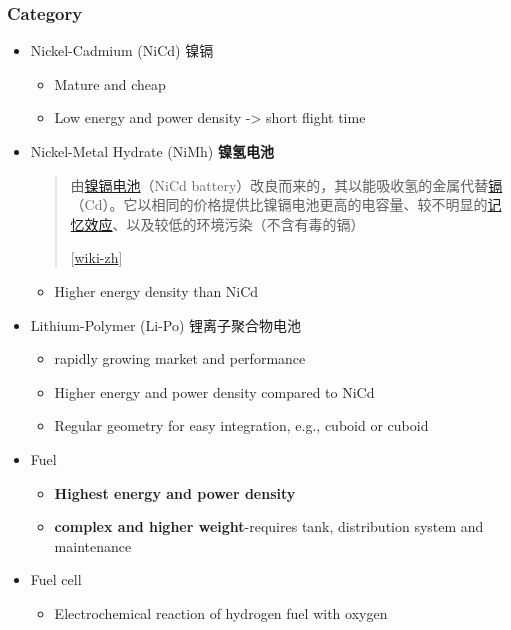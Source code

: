 \documentclass[]{article}
\begin{document}
\subsubsection{Category}\label{header-n1918}

\begin{itemize}
\item
  Nickel-Cadmium (NiCd) \textbar{} 镍镉

  \begin{itemize}
  \item
    Mature and cheap
  \item
    Low energy and power density -\textgreater{} short flight time
  \end{itemize}
\item
  Nickel-Metal Hydrate (NiMh) \textbar{} \textbf{镍氢电池}

  \begin{quote}
  由\href{https://zh.wikipedia.org/wiki/鎳鎘電池}{镍镉电池}（NiCd
  battery）改良而来的，其以能吸收氢的金属代替\href{https://zh.wikipedia.org/wiki/镉}{镉}（Cd）。它以相同的价格提供比镍镉电池更高的电容量、较不明显的\href{https://zh.wikipedia.org/wiki/記憶效應_(電池)}{记忆效应}、以及较低的环境污染（不含有毒的镉）

  {[}\href{https://zh.wikipedia.org/wiki/\%E9\%95\%8D\%E6\%B0\%A2\%E7\%94\%B5\%E6\%B1\%A0}{wiki-zh}{]}
  \end{quote}

  \begin{itemize}
  \item
    Higher energy density than NiCd
  \end{itemize}
\item
  Lithium-Polymer (Li-Po) \textbar{} 锂离子聚合物电池

  \begin{itemize}
  \item
    rapidly growing market and performance
  \item
    Higher energy and power density compared to NiCd
  \item
    Regular geometry for easy integration, e.g., cuboid or cuboid
  \end{itemize}
\item
  Fuel

  \begin{itemize}
  \item
    \textbf{Highest energy and power density}
  \item
    \textbf{complex and higher weight}-requires tank, distribution
    system and maintenance
  \end{itemize}
\item
  Fuel cell

  \begin{itemize}
  \item
    Electrochemical reaction of hydrogen fuel with oxygen
  \end{itemize}
\end{itemize}
\end{document}
